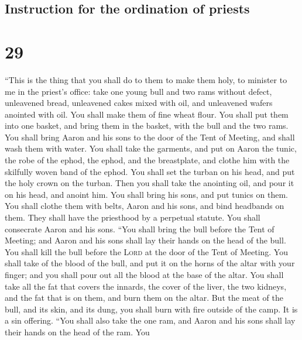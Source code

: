 \hypertarget{instruction-for-the-ordination-of-priests}{%
\subsection{Instruction for the ordination of
priests}\label{instruction-for-the-ordination-of-priests}}

\hypertarget{section-28}{%
\section{29}\label{section-28}}

 ``This is the thing that you shall do to them to make
them holy, to minister to me in the priest's office: take one young bull
and two rams without defect,  unleavened bread, unleavened
cakes mixed with oil, and unleavened wafers anointed with oil. You shall
make them of fine wheat flour.  You shall put them into
one basket, and bring them in the basket, with the bull and the two
rams.  You shall bring Aaron and his sons to the door of
the Tent of Meeting, and shall wash them with water.  You
shall take the garments, and put on Aaron the tunic, the robe of the
ephod, the ephod, and the breastplate, and clothe him with the skilfully
woven band of the ephod.  You shall set the turban on his
head, and put the holy crown on the turban.  Then you
shall take the anointing oil, and pour it on his head, and anoint him.
 You shall bring his sons, and put tunics on them.
 You shall clothe them with belts, Aaron and his sons, and
bind headbands on them. They shall have the priesthood by a perpetual
statute. You shall consecrate Aaron and his sons.  ``You
shall bring the bull before the Tent of Meeting; and Aaron and his sons
shall lay their hands on the head of the bull.  You shall
kill the bull before the \textsc{Lord} at the door of the Tent of
Meeting.  You shall take of the blood of the bull, and
put it on the horns of the altar with your finger; and you shall pour
out all the blood at the base of the altar.  You shall
take all the fat that covers the innards, the cover of the liver, the
two kidneys, and the fat that is on them, and burn them on the altar.
 But the meat of the bull, and its skin, and its dung,
you shall burn with fire outside of the camp. It is a sin offering.
 ``You shall also take the one ram, and Aaron and his
sons shall lay their hands on the head of the ram.  You
